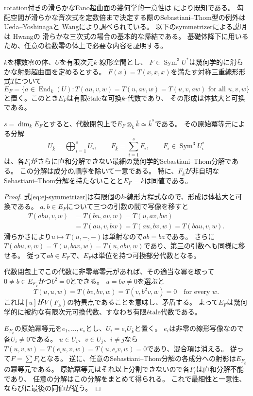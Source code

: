 rotation付きの滑らかなFano超曲面の幾何学的一意性は
\cite[Theorem~5.1]{LZ}により既知である。
勾配空間が滑らかな斉次式を定数倍まで決定する際のSebastiani--Thom型の例外は
Ueda--Yoshinaga\cite[Lemma~3]{UedaYoshinaga}と
Wang\cite[Theorem~1.1, Corollary~1.3]{WangJacobian}により調べられている。
以下のsymmetrizerによる説明は
Hwang\cite[Propositions~2.2, 2.6, 3.1, 3.2]{HwangSymmetrizer}の
滑らかな三次式の場合の基本的な帰結である。
基礎体降下に用いるため、任意の標数零の体上で必要な内容を証明する。

\begin{lemma}[滑らかな三次式のsymmetrizer代数]
\label{ej:lem:symmetrizer-algebra}
$k$を標数零の体、$U$を有限次元$k$-線形空間とし、
$F\in\operatorname{Sym}^3U^*$は幾何学的に滑らかな射影超曲面を定めるとする。
$F(x)=T(x,x,x)$を満たす対称三重線形形式$T$について
\begin{equation}\label{eq:ej-symmetrizer}
 E_F=\{a\in\operatorname{End}_k(U):
 T(au,v,w)=T(u,av,w)=T(u,v,aw)\text{ for all }u,v,w\}
\end{equation}
と置く。このとき$E_F$は有限\'etaleな可換$k$-代数であり、
その形成は体拡大と可換である。

$s=\dim_kE_F$とすると、代数閉包上で$E_F\otimes_k\overline k\simeq\overline k^s$である。
その原始冪等元による分解
\[
 U_{\overline k}=\bigoplus_{i=1}^sU_i,\qquad
 F_{\overline k}=\sum_{i=1}^sF_i,\qquad
 F_i\in\operatorname{Sym}^3U_i^*
\]
は、各$F_i$がさらに直和分解できない最細の幾何学的Sebastiani--Thom分解である。
この分解は成分の順序を除いて一意である。
特に、$F_{\overline k}$が非自明なSebastiani--Thom分解を持たないことと$E_F=k$は同値である。
\end{lemma}
\begin{proof}
式\eqref{eq:ej-symmetrizer}は有限個の$k$-線形方程式なので、形成は体拡大と可換である。
$a,b\in E_F$について三つの引数の間で写像を移すと
\[
 \begin{aligned}
 T(abu,v,w)&=T(bu,av,w)=T(u,av,bw)\\
 &=T(au,v,bw)=T(au,bv,w)=T(bau,v,w).
 \end{aligned}
\]
滑らかさにより$u\mapsto T(u,-,-)$は単射なので$ab=ba$である。
さらに$T(abu,v,w)=T(u,bav,w)=T(u,abv,w)$であり、第三の引数へも同様に移せる。
従って$ab\in E_F$で、$E_F$は単位を持つ可換部分代数となる。

代数閉包上でこの代数に非零冪零元があれば、その適当な冪を取って
$0\ne b\in E_{F_{\overline k}}$かつ$b^2=0$とできる。
$u=bv\ne0$を選ぶと
\[
 T(u,u,w)=T(bv,bv,w)=T(v,b^2v,w)=0
 \quad\text{for every }w.
\]
これは$[u]$が$V(F_{\overline k})$の特異点であることを意味し、矛盾する。
よって$E_F$は幾何学的に被約な有限次元可換代数、すなわち有限\'etale代数である。

$E_{F_{\overline k}}$の原始冪等元を$e_1,\ldots,e_s$とし、$U_i=e_iU_{\overline k}$と置く。
$e_i$は非零の線形写像なので各$U_i\ne0$である。
$u\in U_i$、$v\in U_j$、$i\ne j$なら
$T(u,v,w)=T(e_iu,v,w)=T(u,e_iv,w)=0$であり、混合項は消える。
従って$F=\sum F_i$となる。
逆に、任意のSebastiani--Thom分解の各成分への射影は$E_{F_{\overline k}}$の冪等元である。
原始冪等元はそれ以上分割できないので各$F_i$は直和分解不能であり、
任意の分解はこの分解をまとめて得られる。
これで最細性と一意性、ならびに最後の同値が従う。
\end{proof}

